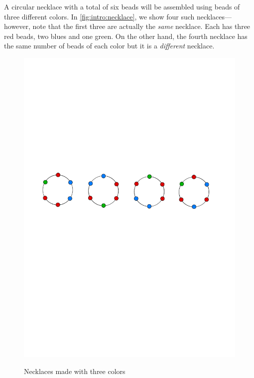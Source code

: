 A circular necklace with a total of six beads will be assembled using beads
of three different colors.  In \autoref{fig:intro:necklace}, we show four such
necklaces---however, note that the first three are actually the \textit{same}
necklace.  Each has three red beads, two blues and one green.  On the 
other hand, the fourth necklace has the same number of beads of each color but
it is a \textit{different} necklace.

\begin{figure}
\begin{center}
\includegraphics[viewport=44 401 537 528, scale=.6]{intro-figs/necklaces}\\
\caption{Necklaces made with three colors} 
\label{fig:intro:necklace}
\end{center}
\end{figure}


